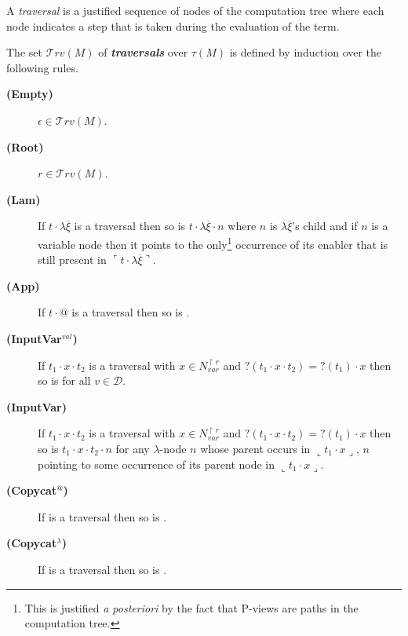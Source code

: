 \documentclass{llncs}
\newcommand\defname[1]{{\bf\em #1}\index{#1}}
\newcommand\travset{\mathcal{T}rv}
\newcommand{\oview}[1]{\llcorner #1 \lrcorner}
\newcommand{\pview}[1]{\ulcorner #1 \urcorner}
\begin{document}
A \emph{traversal} is a justified sequence of nodes of the computation tree where each node
indicates a step that is taken during the evaluation of the term.
\begin{definition}\rm
\label{def:traversal}
The set $\travset(M)$ of \defname{traversals} over $\tau(M)$ is defined by induction over the following rules.

\begin{description}
\item[{\bf (Empty)}] $\epsilon \in \travset(M)$.
\item[{\bf (Root)}] $ r \in \travset(M)$.
\item[{\bf (Lam)}] If $t \cdot \lambda \overline{\xi}$ is a traversal then so is
$t \cdot \lambda \overline{\xi} \cdot n$
where $n$ is $\lambda \overline{\xi}$'s child and if $n$ is a variable node then it points to the only\footnote{This is justified {\it a posteriori} by the fact that P-views are paths in the computation tree.} occurrence of its enabler that is still present in $\pview{t \cdot \lambda \overline{\xi}}$.

\item[{\bf (App)}] If $t \cdot @$ is a traversal then so is .

\item[{\bf (InputVar$^{val}$)}] If $t_1 \cdot x \cdot t_2$ is a traversal
with $x \in N_{var}^{\upharpoonright r}$ and $?(t_1 \cdot x \cdot
t_2)=?(t_1) \cdot x$ then so is  for all $v \in \mathcal{D}$.

\item[{\bf (InputVar)}] If $t_1 \cdot x \cdot t_2$ is a traversal with
  $x \in N_{var}^{\upharpoonright r}$ and $?(t_1 \cdot x \cdot
  t_2)=?(t_1) \cdot x$ then so is $t_1 \cdot x \cdot t_2 \cdot n$ for any
  $\lambda$-node $n$ whose parent occurs in $\oview{t_1 \cdot x}$, $n$
  pointing to some occurrence of its parent node in $\oview{t_1 \cdot x}$.


\item[{\bf (Copycat$^@$)}]
  If  is a traversal then so is
.

\item[{\bf (Copycat$^\lambda$)}] If 
is a traversal then so is .


\end{description}
\end{definition}
\end{document}
